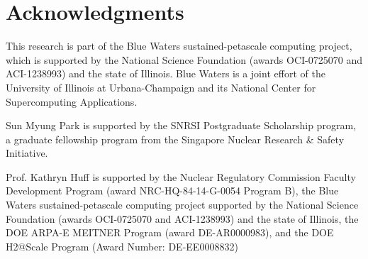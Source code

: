 \section{Acknowledgments}
This research is part of the Blue Waters sustained-petascale computing project,
which is supported by the National Science Foundation (awards OCI-0725070 and
ACI-1238993) and the state of Illinois. Blue Waters is a joint effort of the
University of Illinois at Urbana-Champaign and its National Center for
Supercomputing Applications.

Sun Myung Park is supported by the SNRSI Postgraduate Scholarship program, a
graduate fellowship program from the Singapore Nuclear Research \& Safety
Initiative.

Prof. Kathryn Huff is supported by the Nuclear Regulatory Commission Faculty
Development Program (award NRC-HQ-84-14-G-0054 Program B), the Blue Waters
sustained-petascale computing project supported by the National Science
Foundation (awards OCI-0725070 and ACI-1238993) and the state of Illinois, the
DOE ARPA-E MEITNER Program (award DE-AR0000983), and the DOE H2@Scale Program
(Award Number: DE-EE0008832)
